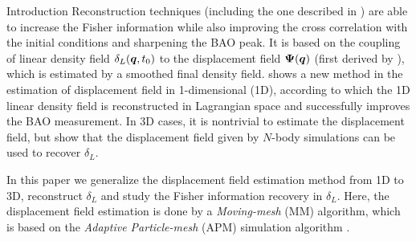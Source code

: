 \begin{section}{Introduction}
Reconstruction techniques (including the one described in 
\cite{bib:HarnoisD2013}) are able to increase the Fisher information
while also improving the cross correlation with the initial conditions
and sharpening the BAO peak. It is based on the coupling of linear
density field $\delta_L(\boldsymbol{q},t_0)$ to the displacement field
$\boldsymbol\Psi(\boldsymbol{q})$ (first derived by \cite{bib:Zel1970}), which
is estimated by a smoothed final density field.
\cite{bib:Zhu2016} shows a new method in the estimation of displacement
field in 1-dimensional (1D), according to which the 1D linear density
field is reconstructed in Lagrangian space and successfully improves 
the BAO measurement. In 3D cases, it is nontrivial to estimate
the displacement field, but \cite{bib:Yu2016} show that the displacement
field given by $N$-body simulations can be used to recover $\delta_L$.

In this paper we generalize the displacement field estimation method
from 1D \citep{bib:Zhu2016} to 3D, reconstruct $\delta_L$ and study
the Fisher information recovery in $\delta_L$. Here, the displacement field
estimation is done by a \textit{Moving-mesh} (MM) algorithm, which is based on
the \textit{Adaptive Particle-mesh} (APM) simulation algorithm \citep{bib:Pen1995,bib:Pen1998}.






\end{section}
